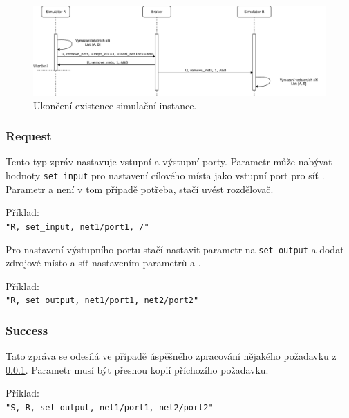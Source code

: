 \begin{figure}[hbt]
 \centering
 \includegraphics[width=1\textwidth]{obrazky-figures/sim-unregister.pdf}
 \caption{Ukončení existence simulační instance.}
 \label{sim-unregister-viz}
\end{figure}

\subsubsection{Request} \label{par:request} Tento typ zpráv nastavuje vstupní a výstupní porty. Parametr  může nabývat hodnoty \texttt{set\_input} pro nastavení cílového místa  jako vstupní port pro síť . Parametr  a  není v tom případě potřeba, stačí uvést rozdělovač.

\begin{tabbing}
 Příklad: \= \\
 \>\texttt{"R, set\_input, net1/port1, /"}
\end{tabbing}

Pro nastavení výstupního portu stačí nastavit parametr  na \texttt{set\_output} a dodat zdrojové místo a síť nastavením parametrů  a .

\begin{tabbing}
 Příklad: \= \\
 \> \texttt{"R, set\_output, net1/port1, net2/port2"} \\
\end{tabbing}

\subsubsection{Success} Tato zpráva se odesílá ve případě úspěšného zpracování nějakého požadavku z \ref{par:request}. Parametr  musí být přesnou kopií příchozího požadavku.

\begin{tabbing}
 Příklad: \= \\
 \> \texttt{"S, R, set\_output, net1/port1, net2/port2"} \\
\end{tabbing}

